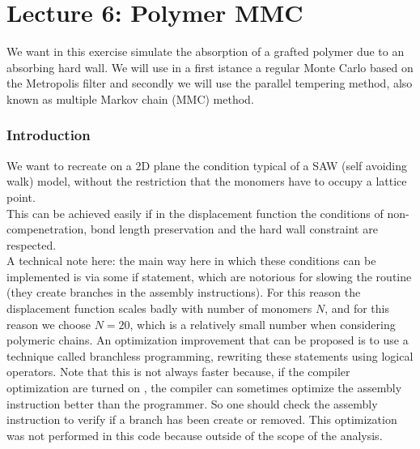 \chapter*{Lecture 6: Polymer MMC}

We want in this exercise simulate the absorption of a grafted polymer due to an absorbing hard wall. We will use in a first 
istance a regular Monte Carlo based on the Metropolis filter and secondly we will use the parallel tempering method, also known as 
multiple Markov chain (MMC) method.

\subsection*{Introduction}

We want to recreate on a 2D plane the condition typical of a SAW (self avoiding walk) model,  without the restriction that the monomers have to 
occupy a lattice point. \\
This can be achieved easily if in the displacement function the conditions of non-compenetration, bond length preservation and the hard wall constraint are respected. \\

A technical note here: the main way here in which these conditions can be implemented is via some if statement, which are notorious for slowing the routine 
(they create branches in the assembly instructions). For this reason the displacement function scales badly with number of monomers $N$, and for this reason we choose $N=20$, which is a relatively small number 
when considering polymeric chains. An optimization improvement that can be proposed is to use a technique called branchless programming, rewriting
these statements using logical operators. Note that this is not always faster because, if the compiler optimization are turned on , the compiler can sometimes
optimize the assembly instruction better than the programmer. So one should check the assembly instruction to verify if a branch has been create or removed. This optimization was not performed in this code 
because outside of the scope of the analysis. \\


